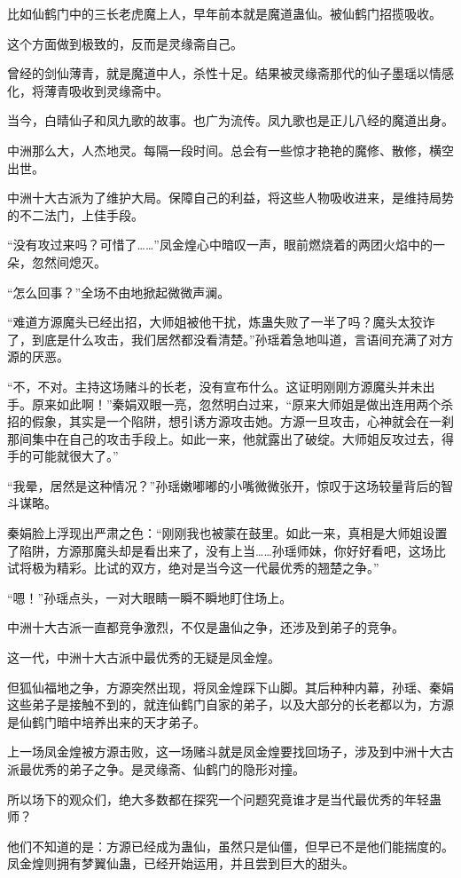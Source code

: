 \begin{this_body}
比如仙鹤门中的三长老虎魔上人，早年前本就是魔道蛊仙。被仙鹤门招揽吸收。

这个方面做到极致的，反而是灵缘斋自己。

曾经的剑仙薄青，就是魔道中人，杀性十足。结果被灵缘斋那代的仙子墨瑶以情感化，将薄青吸收到灵缘斋中。

当今，白晴仙子和凤九歌的故事。也广为流传。凤九歌也是正儿八经的魔道出身。

中洲那么大，人杰地灵。每隔一段时间。总会有一些惊才艳艳的魔修、散修，横空出世。

中洲十大古派为了维护大局。保障自己的利益，将这些人物吸收进来，是维持局势的不二法门，上佳手段。

“没有攻过来吗？可惜了……”凤金煌心中暗叹一声，眼前燃烧着的两团火焰中的一朵，忽然间熄灭。

“怎么回事？”全场不由地掀起微微声澜。

“难道方源魔头已经出招，大师姐被他干扰，炼蛊失败了一半了吗？魔头太狡诈了，到底是什么攻击，我们居然都没看清楚。”孙瑶着急地叫道，言语间充满了对方源的厌恶。

“不，不对。主持这场赌斗的长老，没有宣布什么。这证明刚刚方源魔头并未出手。原来如此啊！”秦娟双眼一亮，忽然明白过来，“原来大师姐是做出连用两个杀招的假象，其实是一个陷阱，想引诱方源攻击她。方源一旦攻击，心神就会在一刹那间集中在自己的攻击手段上。如此一来，他就露出了破绽。大师姐反攻过去，得手的可能就很大了。”

“我晕，居然是这种情况？”孙瑶嫩嘟嘟的小嘴微微张开，惊叹于这场较量背后的智斗谋略。

秦娟脸上浮现出严肃之色：“刚刚我也被蒙在鼓里。如此一来，真相是大师姐设置了陷阱，方源那魔头却是看出来了，没有上当……孙瑶师妹，你好好看吧，这场比试将极为精彩。比试的双方，绝对是当今这一代最优秀的翘楚之争。”

“嗯！”孙瑶点头，一对大眼睛一瞬不瞬地盯住场上。

中洲十大古派一直都竞争激烈，不仅是蛊仙之争，还涉及到弟子的竞争。

这一代，中洲十大古派中最优秀的无疑是凤金煌。

但狐仙福地之争，方源突然出现，将凤金煌踩下山脚。其后种种内幕，孙瑶、秦娟这些弟子是接触不到的，就连仙鹤门自家的弟子，以及大部分的长老都以为，方源是仙鹤门暗中培养出来的天才弟子。

上一场凤金煌被方源击败，这一场赌斗就是凤金煌要找回场子，涉及到中洲十大古派最优秀的弟子之争。是灵缘斋、仙鹤门的隐形对撞。

所以场下的观众们，绝大多数都在探究一个问题究竟谁才是当代最优秀的年轻蛊师？

他们不知道的是：方源已经成为蛊仙，虽然只是仙僵，但早已不是他们能揣度的。凤金煌则拥有梦翼仙蛊，已经开始运用，并且尝到巨大的甜头。


\end{this_body}
